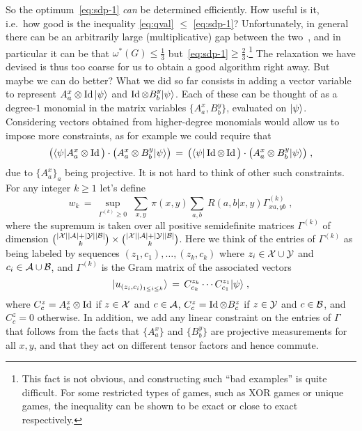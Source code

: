 So the optimum~\eqref{eq:sdp-1} \emph{can} be determined efficiently. How useful is it, i.e.\ how good is the inequality \eqref{eq:qval} $\leq$ \eqref{eq:sdp-1}? Unfortunately, in general there can be an arbitrarily large (multiplicative) gap between the two~\cite{junge2011large}, and in particular it can be that $\omega^*(G) \leq \frac{1}{3}$ but~\eqref{eq:sdp-1}$\geq \frac{2}{3}$.\footnote{This fact is not obvious, and constructing such ``bad examples'' is quite difficult. For some restricted types of games, such as XOR games or unique games, the inequality can be shown to be exact or close to exact respectively.} The relaxation we have devised is thus too coarse for us to obtain a good algorithm right away. 
 But maybe we can do better? What we did so far consists in adding a vector variable to represent $A^x_a \otimes \mathop{\rm Id}\nolimits |\psi\rangle$ and $\mathop{\rm Id}\nolimits \otimes B^y_b |\psi\rangle$. Each of these can be thought of as a degree-$1$ monomial in the matrix variables $\{A^x_a,B^y_b\}$, evaluated on $|\psi\rangle$. Considering vectors obtained from higher-degree monomials would allow us to impose more constraints, as for example we could require that 
\[ \big(\langle\psi| A^x_a  \otimes \mathop{\rm Id}\nolimits \big)\cdot \big( A^x_a \otimes B^y_b |\psi\rangle\big)\,=\,  \big(\langle\psi|\mathop{\rm Id}\nolimits \otimes \mathop{\rm Id}\nolimits \big)\cdot \big( A^x_a \otimes B^y_b |\psi\rangle\big)\;,\]
due to $\{A^x_a\}_a$ being projective. It is not hard to think of other such constraints. For any integer $k\geq 1$ let's define
\begin{equation}\label{eq:opt-sdpk}
w_k\,=\, \sup_{ \Gamma^{(k)} \geq 0 } \;\sum_{x,y}\, \pi(x,y) \sum_{a,b}\, R(a,b|x,y) \Gamma^{(k)}_{xa,yb}\;,
\end{equation}
where the supremum is taken over all positive semidefinite matrices $\Gamma^{(k)}$ of dimension ${|\mathcal{X}||\mathcal{A}|+|\mathcal{Y}||\mathcal{B}| \choose k}\times {|\mathcal{X}||\mathcal{A}|+|\mathcal{Y}||\mathcal{B}| \choose k}$. Here we think of the entries of $\Gamma^{(k)}$ as being labeled by sequences $(z_1,c_1),\ldots,(z_k,c_k)$ where $z_i \in \mathcal{X}\cup\mathcal{Y}$ and $c_i \in \mathcal{A}\cup\mathcal{B}$, and $\Gamma^{(k)}$ is the Gram matrix of the associated vectors 
\[|u_{(z_i,c_i)_{1\leq i \leq k}}\rangle \,=\, C^{z_k}_{c_k} \cdots C^{z_1}_{c_1} |\psi\rangle\;,\]
where $C^z_c = A^z_c\otimes \mathop{\rm Id}\nolimits$ if $z\in \mathcal{X}$ and $c\in \mathcal{A}$, $C^z_c = \mathop{\rm Id}\nolimits \otimes B^z_c$ if $z\in \mathcal{Y}$ and $c\in \mathcal{B}$, and $C^z_c=0$ otherwise. In addition, we add any linear constraint on the entries of $\Gamma$ that follows from the facts that $\{A^x_a\}$ and $\{B^y_b\}$ are projective measurements for all $x,y$, and that they act on different tensor factors and hence commute. 

